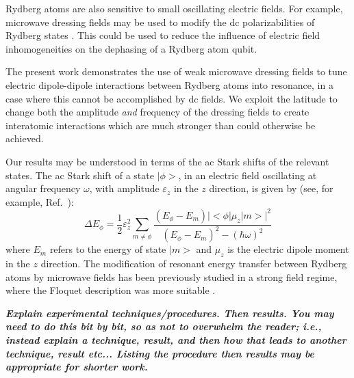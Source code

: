 \documentclass[letterpaper,twocolumn,showpacs,preprintnumbers,amsmath,amssymb,prl,nolongbibliography]{revtex4-2}
\begin{document}
Rydberg atoms are also sensitive to small oscillating electric
fields.   For example, microwave dressing
fields may be used to modify the dc polarizabilities of Rydberg
states \cite{hyafil:2004}.
This could be used to reduce the influence of electric field
inhomogeneities on the dephasing of a Rydberg atom qubit.

The present work demonstrates the use of weak microwave
dressing fields to tune electric dipole-dipole
interactions between Rydberg atoms into resonance,
in a case where this cannot
be accomplished by dc fields.  We exploit the latitude to change
both the amplitude {\em and} frequency of the dressing fields to
create interatomic interactions which are much stronger than could
otherwise be achieved.

Our results may be understood in terms of the ac Stark shifts of
the relevant states.
The ac Stark shift of a state $|\phi\!\!>$, in an
electric field oscillating at angular frequency $\omega$,
with amplitude $\varepsilon_z$ in the $z$ direction,
is given by (see, for example, Ref.~\cite{haas:2006}):
\begin{equation}
\Delta E_{\phi} = \frac{1}{2} \varepsilon_z^2
\sum_{m \ne \phi} \frac{(E_{\phi}-E_m)
|\!\!<\!\! \phi | \mu_z | m \!\!>\!\!|^2}
{(E_{\phi}-E_m)^2 - (\hbar \omega)^2}
\label{eq:shift}
\end{equation}
where $E_m$ refers to the energy of state $|m \!\! >$
and $\mu_z$ is the electric dipole moment in the $z$ direction.
The modification of resonant energy transfer between Rydberg atoms by
microwave fields has been previously studied
in a strong field regime, where the Floquet description
was more suitable \cite{kachru:1982,pillet:1983}.

\textbf{\emph{Explain experimental techniques/procedures.  Then results.  You may need to do this bit by bit, so as not to overwhelm the reader; i.e., instead explain a technique, result, and then how that leads to another technique, result etc...  Listing the procedure then results may be appropriate for shorter work.}}
\end{document}
